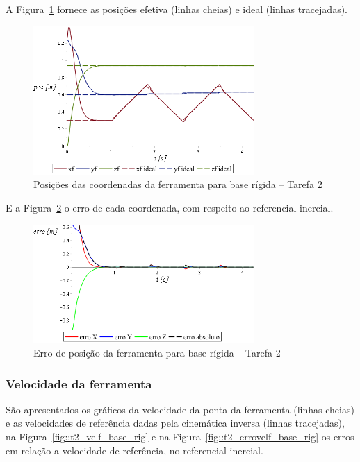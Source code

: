 A Figura~\ref{fig::t2_posf_base_rig} fornece as posições efetiva (linhas cheias)
e ideal (linhas tracejadas). 

\begin{figure}[h!]
	\centering 
 	\includegraphics[width=0.75\textwidth]{figs/t2_posf_base_rig}
 	\caption{Posições das coordenadas da ferramenta para base rígida -- Tarefa 2}
 	\label{fig::t2_posf_base_rig}
\end{figure}

E a Figura~\ref{fig::t2_erroposf_base_rig} o erro
de cada coordenada, com respeito ao referencial inercial.

\begin{figure}[h!]
	\centering 
 	\includegraphics[width=0.75\textwidth]{figs/t2_erroposf_base_rig}
 	\caption{Erro de posição da ferramenta para base rígida -- Tarefa 2}
 	\label{fig::t2_erroposf_base_rig}
\end{figure}


\subsubsection{Velocidade da ferramenta}

São apresentados os gráficos da velocidade da ponta da ferramenta (linhas
cheias) e as velocidades de referência dadas pela cinemática inversa (linhas
tracejadas), na Figura~\ref{fig::t2_velf_base_rig} e na
Figura~\ref{fig::t2_errovelf_base_rig} os erros em relação a velocidade de
referência, no referencial inercial.


